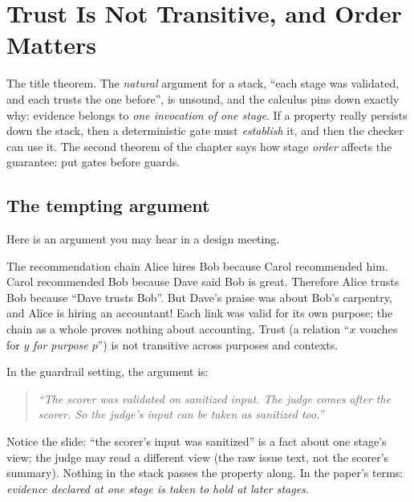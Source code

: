 \section{Trust Is Not Transitive, and Order Matters}
\label{ch:transitive}

\begin{bigidea}
The title theorem. The \emph{natural} argument for a stack, ``each stage was validated, and each trusts the one before'', is unsound, and the calculus pins down exactly why: evidence belongs to \emph{one invocation of one stage}. If a property really persists down the stack, then a deterministic gate must \emph{establish} it, and then the checker can use it. The second theorem of the chapter says how stage \emph{order} affects the guarantee: put gates before guards.
\end{bigidea}

\subsection{The tempting argument}

Here is an argument you may hear in a design meeting.

\begin{story}{The recommendation chain}
Alice hires Bob because Carol recommended him. Carol recommended Bob because Dave said Bob is great. Therefore Alice trusts Bob because ``Dave trusts Bob''. But Dave's praise was about Bob's carpentry, and Alice is hiring an accountant! Each link was valid for its own purpose; the chain as a whole proves nothing about accounting. Trust (a relation ``$x$ vouches for $y$ \emph{for purpose $p$}'') is not transitive across purposes and contexts.
\end{story}

In the guardrail setting, the argument is:

\begin{quote}
\emph{``The scorer was validated on sanitized input. The judge comes after the scorer. So the judge's input can be taken as sanitized too.''}
\end{quote}

Notice the slide: ``the scorer's input was sanitized'' is a fact about one stage's view; the judge may read a different view (the raw issue text, not the scorer's summary). Nothing in the stack passes the property along. In the paper's terms: \emph{evidence declared at one stage is taken to hold at later stages}.

